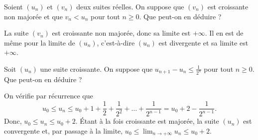 \begin{question}

Soient $(u_n)$ et $(v_n)$ deux suites réelles. On suppose que $(v_n)$ est croissante non majorée et que $\displaystyle v_n < u_n$ pour tout $n\geq 0$. Que peut-on en déduire ?
\begin{answers}  
\end{answers}
\begin{explanations}
La suite $(v_n)$ est croissante non majorée, donc sa limite est $+\infty$. Il en est de même pour la limite de $(u_n)$, c'est-à-dire $(u_n)$ est divergente et sa limite est $+\infty$.
\end{explanations}
\end{question}


\begin{question}

Soit $(u_n)$ une suite croissante. On suppose que $\displaystyle u_{n+1}-u_n\leq \frac{1}{2^n}$ pour tout $n\geq 0$. Que peut-on en déduire ?
\begin{answers}  
\end{answers}
\begin{explanations}
On vérifie par récurrence que 
$$\displaystyle u_0\leq u_n\leq u_0+1+\frac{1}{2}+\frac{1}{2^2}+\dots +\frac{1}{2^{n-1}}=u_0+2-\frac{1}{2^{n-1}}.$$
Donc, $u_0\leq u_n\leq u_0+2$. Étant à la fois croissante est majorée, la suite $(u_n)$ est convergente et, par passage à la limite, $\displaystyle u_0\leq \lim _{n\to +\infty}u_n\leq u_0+2$.
\end{explanations}
\end{question}


